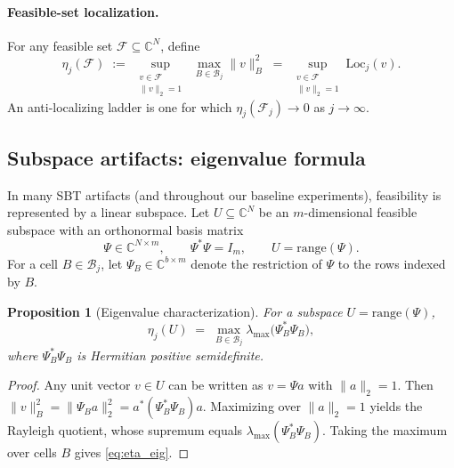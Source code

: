 \documentclass[11pt]{article}
\theoremstyle{plain}
\newtheorem{proposition}[theorem]{Proposition}
\theoremstyle{definition}
\theoremstyle{remark}
\newcommand{\C}{\mathbb{C}}
\begin{document}
\paragraph{Feasible-set localization.}
For any feasible set \(\mathcal{F} \subseteq \C^N\), define
\begin{equation}\label{eq:etaj_general}
\eta_j(\mathcal{F}) \;:=\; \sup_{\substack{v \in \mathcal{F}\\ \|v\|_2 = 1}} \;\max_{B \in \mathcal{B}_j} \|v\|_B^2
\;=\; \sup_{\substack{v \in \mathcal{F}\\ \|v\|_2 = 1}} \mathrm{Loc}_j(v).
\end{equation}
An anti-localizing ladder is one for which \(\eta_j(\mathcal{F}_j) \to 0\) as \(j \to \infty\).

\subsection{Subspace artifacts: eigenvalue formula}\label{subsec:eta_eig_formula}

In many SBT artifacts (and throughout our baseline experiments), feasibility is represented by a linear subspace.
Let \(U \subseteq \C^N\) be an \(m\)-dimensional feasible subspace with an orthonormal basis matrix
\[
\Psi \in \C^{N \times m}, \qquad \Psi^\ast \Psi = I_m, \qquad U = \mathrm{range}(\Psi).
\]
For a cell \(B \in \mathcal{B}_j\), let \(\Psi_B \in \C^{b \times m}\) denote the restriction of \(\Psi\) to the rows indexed by \(B\).

\begin{proposition}[Eigenvalue characterization]\label{prop:eta_eigenvalue}
For a subspace \(U = \mathrm{range}(\Psi)\),
\begin{equation}\label{eq:eta_eig}
\eta_j(U) \;=\; \max_{B \in \mathcal{B}_j} \lambda_{\max}\!\bigl(\Psi_B^\ast \Psi_B\bigr),
\end{equation}
where \(\Psi_B^\ast \Psi_B\) is Hermitian positive semidefinite.
\end{proposition}

\begin{proof}
Any unit vector \(v \in U\) can be written as \(v = \Psi a\) with \(\|a\|_2 = 1\).
Then \(\|v\|_B^2 = \|\Psi_B a\|_2^2 = a^\ast (\Psi_B^\ast \Psi_B)a\).
Maximizing over \(\|a\|_2=1\) yields the Rayleigh quotient, whose supremum equals \(\lambda_{\max}(\Psi_B^\ast \Psi_B)\).
Taking the maximum over cells \(B\) gives \eqref{eq:eta_eig}.
\end{proof}
\end{document}
